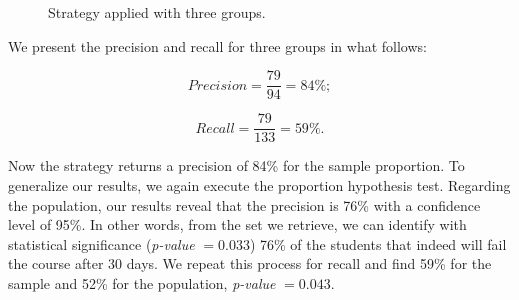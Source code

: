 \begin{figure}[!ht]
\begin{center}
{             \label{fig:3-2013-01}
         }
     \end{center}
     \caption{Strategy applied with three groups.}
	 \label{fig:3-groups}
\end{figure}

We present the precision and recall for three groups in what follows:

\vspace{0.2cm}
\noindent
\begin{minipage}{.5\linewidth}
\centering
$$
Precision = \frac{79}{94} = 84\%;
$$
\end{minipage}
\begin{minipage}{.5\linewidth}
$$
Recall = \frac{79}{133} = 59\%.
$$
\end{minipage}
\vspace{0.2cm}

Now the strategy returns a precision of 84\% for the sample proportion. To generalize our results, we again execute the proportion hypothesis test. Regarding the population, our results reveal that the precision is 76\% with a confidence level of 95\%. In other words, from the set we retrieve,  we can identify with statistical significance (\textit{p-value} $= 0.033$) 76\% of the students that indeed will fail the course after 30 days. We repeat this process for recall and find 59\% for the sample and 52\% for the population, \textit{p-value} $= 0.043$.

